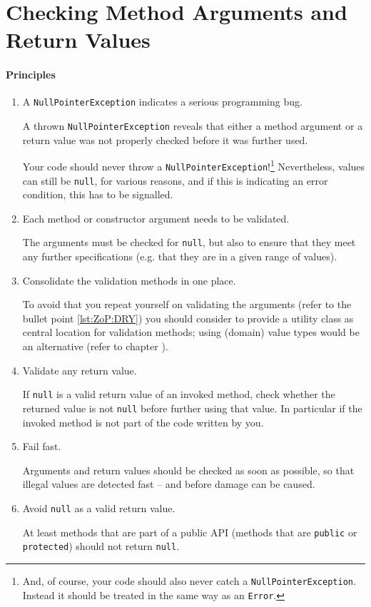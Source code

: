 \chapter{Checking Method Arguments and Return Values}\label{sec:CheckingMethodParametersAndReturnValues}

\subsubsection{Principles}
\begin{enumerate}[label=P\arabic*.]
\item{A \lstinline|NullPointerException| indicates a serious programming bug.

A thrown \lstinline|NullPointerException|\autocite{ORACLE_DOC_NULLPOINTEREXCEPTION_CLASS} reveals that either a method argument or a return value was not properly checked before it was further used.

Your code should never throw a \lstinline|NullPointerException|!\footnote{And, of course, your code should also never catch a \lstinline|NullPointerException|. Instead it should be treated in the same way as an \lstinline|Error|.} Nevertheless, values can still be \lstinline|null|, for various reasons, and if this is indicating an error condition, this has to be signalled.}

\item{Each method or constructor argument needs to be validated.

The arguments must be checked for \lstinline|null|, but also to ensure that they meet any further specifications (e.g. that they are in a given range of values).}

\item{Consolidate the validation methods in one place.

To avoid that you repeat yourself on validating the arguments (refer to the \ngref~ bullet point \ref{lst:ZoP:DRY}) you should consider to provide a utility class as central location for validation methods; using (domain) value types would be an alternative (refer to chapter ).}

\item{Validate any return value.

If \lstinline|null| is a valid return value of an invoked method, check whether the returned value is not \lstinline|null| before further using that value. In particular if the invoked method is not part of the code written by you.}

\item{Fail fast.

Arguments and return values should be checked as soon as possible, so that illegal values are detected fast – and before damage can be caused.}

\item{Avoid \lstinline|null| as a valid return value.

At least methods that are part of a public API (methods that are \lstinline|public| or \lstinline|protected|) should not return \lstinline|null|.}
\end{enumerate}

